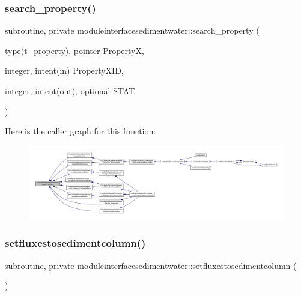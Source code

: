 \subsubsection{\texorpdfstring{search\+\_\+property()}{search\_property()}}
{\footnotesize\ttfamily subroutine, private moduleinterfacesedimentwater\+::search\+\_\+property (\begin{DoxyParamCaption}\item[{type(\mbox{\hyperlink{structmoduleinterfacesedimentwater_1_1t__property}{t\+\_\+property}}), pointer}]{PropertyX,  }\item[{integer, intent(in)}]{Property\+X\+ID,  }\item[{integer, intent(out), optional}]{S\+T\+AT }\end{DoxyParamCaption})\hspace{0.3cm}{\ttfamily [private]}}

Here is the caller graph for this function\+:\nopagebreak
\begin{figure}[H]
\begin{center}
\leavevmode
\includegraphics[width=350pt]{namespacemoduleinterfacesedimentwater_ae241bc3d883ac6be0459ecc4b5128d68_icgraph}
\end{center}
\end{figure}
\mbox{\label{namespacemoduleinterfacesedimentwater_a1493bc1b914a1c9424edba0cd5747eef}} 
\subsubsection{\texorpdfstring{setfluxestosedimentcolumn()}{setfluxestosedimentcolumn()}}
{\footnotesize\ttfamily subroutine, private moduleinterfacesedimentwater\+::setfluxestosedimentcolumn (\begin{DoxyParamCaption}{ }\end{DoxyParamCaption})\hspace{0.3cm}{\ttfamily [private]}}

